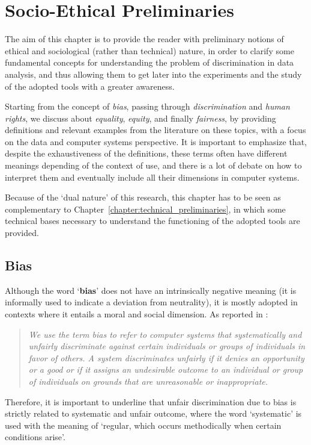 \chapter{Socio-Ethical Preliminaries}
\label{chapter:socio-ethical_preliminaries}
\thispagestyle{empty}

The aim of this chapter is to provide the reader with preliminary notions of ethical and sociological (rather than technical) nature, in order to clarify some fundamental concepts for understanding the problem of discrimination in data analysis, and thus allowing them to get later into the experiments and the study of the adopted tools with a greater awareness.

Starting from the concept of \textit{bias}, passing through \textit{discrimination} and \textit{human rights}, we discuss about \textit{equality}, \textit{equity}, and finally \textit{fairness}, by providing definitions and relevant examples from the literature on these topics, with a focus on the data and computer systems perspective. It is important to emphasize that, despite the exhaustiveness of the definitions, these terms often have different meanings depending of the context of use, and there is a lot of debate on how to interpret them and eventually include all their dimensions in computer systems.

Because of the `dual nature' of this research, this chapter has to be seen as complementary to Chapter~\ref{chapter:technical_preliminaries}, in which some technical bases necessary to understand the functioning of the adopted tools are provided.


\section{Bias}
\label{section:bias}
Although the word `\textbf{bias}' does not have an intrinsically negative meaning (it is informally used to indicate a deviation from neutrality), it is mostly adopted in contexts where it entails a moral and social dimension. As reported in \cite{friedman2017bias}:
\begin{quote}\emph{We use the term bias to refer to computer systems that \emph{systematically} and \emph{unfairly discriminate} against certain individuals or groups of individuals in favor of others. A system discriminates unfairly if it denies an opportunity or a good or if it assigns an undesirable outcome to an individual or group of individuals on grounds that are unreasonable or inappropriate.} \cite[p.~332]{friedman2017bias}\end{quote}
Therefore, it is important to underline that unfair discrimination due to bias is strictly related to systematic and unfair outcome, where the word `systematic' is used with the meaning of `regular, which occurs methodically when certain conditions arise'.

